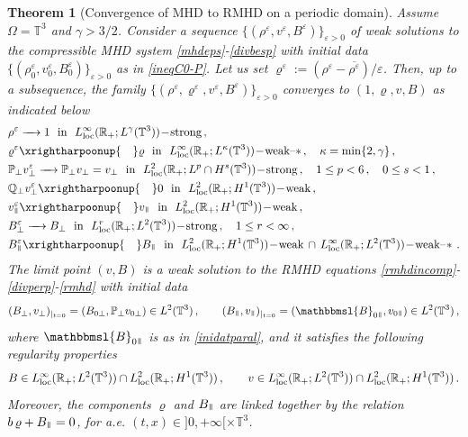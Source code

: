 \documentclass[11pt,reqno]{amsart}
\newtheorem{theorem}{Theorem}
\def \R{{\mathbb{R}}}
\def \Q{{\mathbb{Q}}}
\def \T{{\mathbb{T}}}
\def \P{{\mathbb{P}}}
\newcommand{\myparallel}{{\mkern3mu\vphantom{\perp}\vrule depth 0pt\mkern2mu\vrule depth 0pt\mkern3mu}}
\begin{document}
\begin{theorem}[Convergence of MHD to RMHD on a periodic domain] \label{TH-CV-P} Assume $ \Omega = \T^3 $ and $\gamma>3/2$. Consider a sequence $\{(\rho^\varepsilon,v^\varepsilon, B^\varepsilon)\}_{\varepsilon >0}$ of weak solutions to the compressible MHD system \eqref{mhdeps}-\eqref{divbesp} with initial data  $\{(\rho_0^\varepsilon,v_0^\varepsilon, B_0^\varepsilon)\}_{\varepsilon >0}$ as in \eqref{ineqC0-P}. Let us set $\varrho^\varepsilon:=(\rho^\varepsilon-\overline{\rho^\varepsilon})/\varepsilon$. Then, up to a subsequence, the family $\{(\rho^\varepsilon,\varrho^\varepsilon, v^\varepsilon, B^\varepsilon)\}_{\varepsilon >0}$  converges to $(1,\varrho, v, B)$  as indicated below
\begin{equation*}
  \label{cv-th-P}
  \begin{aligned}
    & \rho^\varepsilon \xrightarrow{\quad}  1 \ \ \mbox{\rm in }\  L_{\rm loc}^\infty(\R_+; L^\gamma(\T^3))\!-\!\mbox{\rm strong} \,,  \\
    & \varrho^\varepsilon \xrightharpoonup{\quad}  \varrho  \ \  \mbox{\rm in } \ L_{\rm loc}^\infty(\R_+; L^\kappa(\T^3))\!-\!\mbox{\rm weak--}\ast\,, \quad \kappa=\min\{2,\gamma\} \,,  \\
    &\P_\perp v_\perp^\varepsilon \xrightarrow{\quad} \P_\perp v_\perp=v_\perp  \ \ \mbox{\rm in }\  L_{\rm loc}^2(\R_+; L^p\cap H^s(\T^3))\!-\!\mbox{\rm strong}\,, \quad 1 \leq p < 6\,, \quad 0\leq s<1\,,  \\
    &\Q_\perp v_\perp^\varepsilon  \xrightharpoonup{\quad}  0  \ \ \mbox{\rm in } \ L_{\rm loc}^2(\R_+; H^1(\T^3))\!-\!\mbox{\rm weak}\,,  \\
    & v_\myparallel^\varepsilon \xrightharpoonup{\quad}  v_\myparallel  \ \ \mbox{\rm in } \ L_{\rm loc}^2(\R_+; H^1(\T^3))\!-\!\mbox{\rm weak}\,,  \\
    &B_\perp^\varepsilon \xrightarrow{\quad} B_\perp  \ \ \mbox{\rm in } \ L_{\rm loc}^r(\R_+; L^2(\T^3))\!-\!\mbox{\rm strong}\,, \quad 1 \leq r < \infty\,,  \\
    &B_\myparallel^\varepsilon \xrightharpoonup{\quad} B_\myparallel\ \ \mbox{\rm in } \ L_{\rm loc}^2(\R_+; H^1(\T^3))\!-\!\mbox{\rm weak} \, \cap \,
     L_{\rm loc}^\infty(\R_+; L^2(\T^3))\!-\!\mbox{\rm weak--}\!\ast\,.
  \end{aligned}
\end{equation*}
The limit point $(v, B)$ is a weak solution to the RMHD equations \eqref{rmhdincomp}-\eqref{divperp}-\eqref{rmhd} with initial data
\[
(B_\perp, v_\perp)_{|_{t=0}} = (B_{0 \perp},\P_\perp v_{0 \perp}) \in L^2(\T^3) \, , \qquad (B_\myparallel, v_\myparallel)_{|_{t=0}} = (\mathbbmsl{B}_{0 \myparallel}, v_{0 \myparallel}) \in L^2(\T^3) \, ,
\]
where $ \mathbbmsl{B}_{0\myparallel} $ is as in \eqref{inidatparal}, and it satisfies the following regularity properties
\[
B\in L_{\rm loc}^\infty (\R_+; L^2(\T^3)) \cap L_{\rm loc}^2 (\R_+; H^1(\T^3)) \, , \qquad
v\in L_{\rm loc}^\infty (\R_+; L^2(\T^3)) \cap L_{\rm loc}^2 (\R_+; H^1(\T^3)) \, .
\]
Moreover, the components $ \varrho $ and $ B_\myparallel $ are linked together by the relation $ b \, \varrho + B_\myparallel = 0 $, for a.e. $(t,x) \in ]0,+\infty[ \times \T^3$.
\end{theorem}
\end{document}
